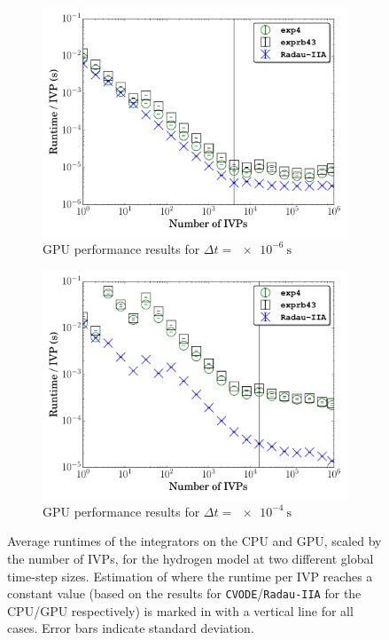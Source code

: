 \documentclass[preprint,review,11pt]{elsarticle}
\begin{document}
\begin{figure}[htbp]
\begin{subfigure}{0.49\textwidth}
      \includegraphics[width=\linewidth]{H2_1e-06_gpu.pdf}
      \caption{GPU performance results for $\Delta t = \SI{e-6}{\second}$}
      \label{F:h2_gpu_perf_small}
  \end{subfigure}
  \begin{subfigure}{0.49\textwidth}
      \includegraphics[width=\linewidth]{H2_1e-04_gpu.pdf}
      \caption{GPU performance results for $\Delta t = \SI{e-4}{\second}$}
      \label{F:h2_gpu_perf_large}
  \end{subfigure}
  \caption{Average runtimes of the integrators on the CPU and GPU, scaled by the number of IVPs, for the hydrogen model at two different global time-step sizes.
  Estimation of where the runtime per IVP reaches a constant value (based on the results for \texttt{CVODE}\slash\texttt{Radau-IIA} for the CPU\slash GPU respectively) is marked in with a vertical line for all cases.
  Error bars indicate standard deviation.}
  \label{F:H2_perf}
\end{figure}
\end{document}

